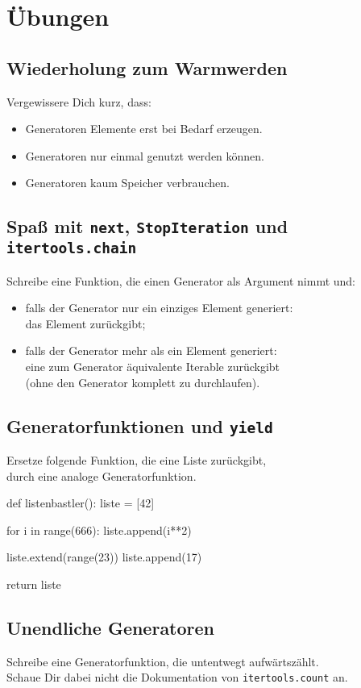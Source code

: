 \documentclass[a4paper, 14 pt]{extarticle}
\begin{document}
\section{Übungen}
\vfill
\subsection{Wiederholung zum Warmwerden}
Vergewissere Dich kurz, dass:
\begin{itemize}
	\item Generatoren Elemente erst bei Bedarf erzeugen.
	\item Generatoren nur einmal genutzt werden können.
	\item Generatoren kaum Speicher verbrauchen.
\end{itemize}

\vfill

\subsection{Spaß mit \texttt{next}, \texttt{StopIteration} und \texttt{itertools.chain}}
Schreibe eine Funktion, die einen Generator als Argument nimmt und:
\begin{itemize}
	\item falls der Generator nur ein einziges Element generiert:\\
		das Element zurückgibt;
	\item falls der Generator mehr als ein Element generiert:\\
		eine zum Generator äquivalente Iterable zurückgibt\\ (ohne den Generator komplett zu durchlaufen).
\end{itemize}

\vfill

\subsection{Generatorfunktionen und \texttt{yield}}
Ersetze folgende Funktion, die eine Liste zurückgibt,\\ durch eine analoge Generatorfunktion.
\begin{python3code}
	def listenbastler():
		liste = [42]
		
		for i in range(666):
			liste.append(i**2)
		
		liste.extend(range(23))
		liste.append(17)
		
		return liste
\end{python3code}

\subsection{Unendliche Generatoren}
Schreibe eine Generatorfunktion, die untentwegt aufwärtszählt.\\
Schaue Dir dabei nicht die Dokumentation von \texttt{itertools.count} an.
\end{document}
